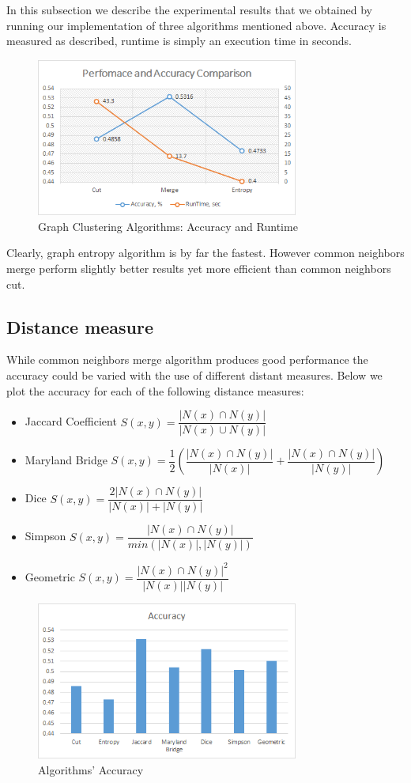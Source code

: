 \documentclass[journal]{IEEEtran}
\begin{document}
In this subsection we describe the experimental results that we obtained by running our implementation of three algorithms mentioned above. Accuracy is measured as described, runtime is simply an execution time in seconds. 
\begin{figure}[h!]
	\includegraphics[width=3.4in,clip,keepaspectratio]{perfomance-comparison}
	\caption{Graph Clustering Algorithms: Accuracy and Runtime}
\end{figure}


Clearly, graph entropy algorithm is by far the fastest. However common neighbors merge perform slightly better results yet more efficient than common neighbors cut. 

\subsection{Distance measure}
While common neighbors merge algorithm produces good performance the accuracy could be varied with the use of different distant measures. Below we plot the accuracy for each of the following distance measures:
\begin{itemize}
	\item Jaccard Coefficient $S(x,y)=\dfrac{|N(x) \cap N(y)|}{|N(x) \cup N(y)|}$
	\item Maryland Bridge $S(x,y)=\dfrac{1}{2} (\dfrac{|N(x) \cap N(y)|}{|N(x)|} + \dfrac{|N(x) \cap N(y)|}{|N(y)|})$
	\item Dice $S(x,y)=\dfrac{2|N(x) \cap N(y)|}{|N(x)| + |N(y)|}$
	\item Simpson $S(x,y)=\dfrac{|N(x) \cap N(y)|}{min(|N(x)|, |N(y)|)}$
	\item Geometric $S(x,y)=\dfrac{|N(x) \cap N(y)|^2}{|N(x)| |N(y)|}$
\end{itemize}

\begin{figure}[h!]
	\includegraphics[width=3.4in,clip,keepaspectratio]{distance-measures}
	\caption{Algorithms' Accuracy}
	
\end{figure}
\end{document}
